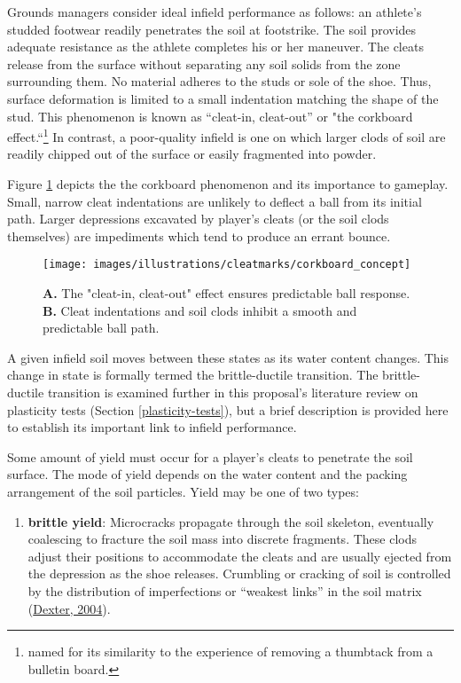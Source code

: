 \documentclass[
  letterpaper,
  openany]{book}
\providecommand{\tightlist}{%
  \setlength{\itemsep}{0pt}\setlength{\parskip}{0pt}}
\begin{document}
Grounds managers consider ideal infield performance as follows: an athlete's studded footwear readily penetrates the soil at footstrike.
The soil provides adequate resistance as the athlete completes his or her maneuver.
The cleats release from the surface without separating any soil solids from the zone surrounding them.
No material adheres to the studs or sole of the shoe.
Thus, surface deformation is limited to a small indentation matching the shape of the stud.
This phenomenon is known as ``cleat-in, cleat-out'' or "the corkboard effect.``\footnote{named for its similarity to the experience of removing a thumbtack from a bulletin board.}
In contrast, a poor-quality infield is one on which larger clods of soil are readily chipped out of the surface or easily fragmented into powder.

Figure \ref{fig:corkboard-concept} depicts the the corkboard phenomenon and its importance to gameplay.
Small, narrow cleat indentations are unlikely to deflect a ball from its initial path. Larger depressions excavated by player's cleats (or the soil clods themselves) are impediments which tend to produce an errant bounce.

\begin{figure}

{\centering \texttt{[image: images/illustrations/cleatmarks/corkboard\_concept]} 

}

\caption["Cleat-in, cleat-out" effect]{\textbf{A.} The "cleat-in, cleat-out" effect ensures predictable ball response. \textbf{B.} Cleat indentations and soil clods inhibit a smooth and predictable ball path.}\label{fig:corkboard-concept}
\end{figure}

A given infield soil moves between these states as its water content changes.
This change in state is formally termed the brittle-ductile transition. The brittle-ductile transition is examined further in this proposal's literature review on plasticity tests (Section \ref{plasticity-tests}), but a brief description is provided here to establish its important link to infield performance.

Some amount of yield must occur for a player's cleats to penetrate the soil surface.
The mode of yield depends on the water content and the packing arrangement of the soil particles. Yield may be one of two types:

\begin{enumerate}
\def\labelenumi{\arabic{enumi}.}
\tightlist
\item
  \textbf{brittle yield}: Microcracks propagate through the soil skeleton, eventually coalescing to fracture the soil mass into discrete fragments. These clods adjust their positions to accommodate the cleats and are usually ejected from the depression as the shoe releases. Crumbling or cracking of soil is controlled by the distribution of imperfections or ``weakest links'' in the soil matrix (\protect\hyperlink{ref-Dexter2004}{Dexter, 2004}).
\end{enumerate}
\end{document}
